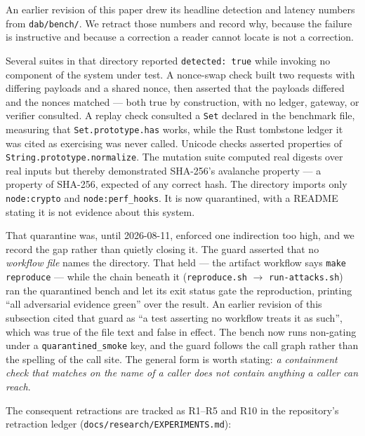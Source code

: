 \documentclass[10pt,twocolumn,letterpaper]{article}
\begin{document}
An earlier revision of this paper drew its headline detection and latency
numbers from \texttt{dab/bench/}. We retract those numbers and record why,
because the failure is instructive and because a correction a reader cannot
locate is not a correction.

Several suites in that directory reported \texttt{detected: true} while
invoking no component of the system under test. A nonce-swap check built two
requests with differing payloads and a shared nonce, then asserted that the
payloads differed and the nonces matched --- both true by construction, with
no ledger, gateway, or verifier consulted. A replay check consulted a
\texttt{Set} declared in the benchmark file, measuring that
\texttt{Set.prototype.has} works, while the Rust tombstone ledger it was
cited as exercising was never called. Unicode checks asserted properties of
\texttt{String.prototype.normalize}. The mutation suite computed real digests
over real inputs but thereby demonstrated SHA-256's avalanche property --- a
property of SHA-256, expected of any correct hash. The directory imports only
\texttt{node:crypto} and \texttt{node:perf\_hooks}. It is now quarantined,
with a README stating it is not evidence about this system.

That quarantine was, until 2026-08-11, enforced one indirection too high, and
we record the gap rather than quietly closing it. The guard asserted that no
\emph{workflow file} names the directory. That held --- the artifact workflow
says \texttt{make reproduce} --- while the chain beneath it
(\texttt{reproduce.sh} $\to$ \texttt{run-attacks.sh}) ran the quarantined bench
and let its exit status gate the reproduction, printing ``all adversarial
evidence green'' over the result. An earlier revision of this subsection cited
that guard as ``a test asserting no workflow treats it as such'', which was true
of the file text and false in effect. The bench now runs non-gating under a
\texttt{quarantined\_smoke} key, and the guard follows the call graph rather than
the spelling of the call site. The general form is worth stating: \emph{a
containment check that matches on the name of a caller does not contain
anything a caller can reach}.

The consequent retractions are tracked as R1--R5 and R10 in the repository's
retraction ledger (\texttt{docs/research/EXPERIMENTS.md}):
\end{document}
